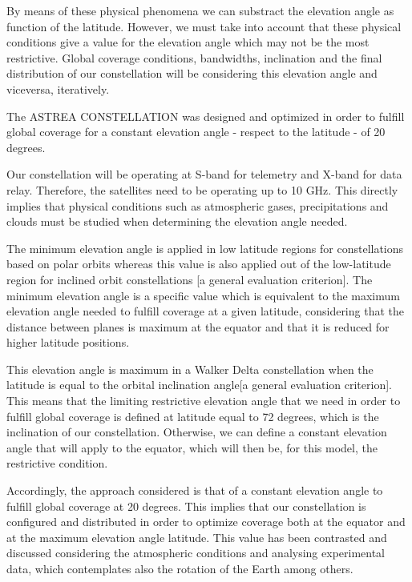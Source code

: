 By means of these physical phenomena we can substract the elevation angle as function of the latitude. However, we must take into account that these physical conditions give a value for the elevation angle which may not be the most restrictive. Global coverage conditions, bandwidths, inclination and the final distribution of our constellation will be considering this elevation angle and viceversa, iteratively.

The ASTREA CONSTELLATION was designed and optimized in order to fulfill global coverage for a constant elevation angle - respect to the latitude - of 20 degrees.

Our constellation will be operating at S-band for telemetry and X-band for data relay. Therefore, the satellites need to be operating up to 10 GHz. This directly implies that physical conditions such as atmospheric gases, precipitations and clouds must be studied when determining the elevation angle needed.

The minimum elevation angle is applied in low latitude regions for constellations based on polar orbits whereas this value is also applied out of the low-latitude region for inclined orbit constellations [a general evaluation criterion]. The minimum elevation angle is a specific value which is equivalent to the maximum elevation angle needed to fulfill coverage at a given latitude, considering that the distance between planes is maximum at the equator and that it is reduced for higher latitude positions.

This elevation angle is maximum in a Walker Delta constellation when the latitude is equal to the orbital inclination angle[a general evaluation criterion]. This means that the limiting restrictive elevation angle that we need in order to fulfill global coverage is defined at latitude equal to 72 degrees, which is the inclination of our constellation. Otherwise, we can define a constant elevation angle that will apply to the equator, which will then be, for this model, the restrictive condition.

Accordingly, the approach considered is that of a constant elevation angle to fulfill global coverage at 20 degrees. This implies that our constellation is configured and distributed in order to optimize coverage both at the equator and at the maximum elevation angle latitude. This value has been contrasted and discussed considering the atmospheric conditions and analysing experimental data, which contemplates also the rotation of the Earth among others.

